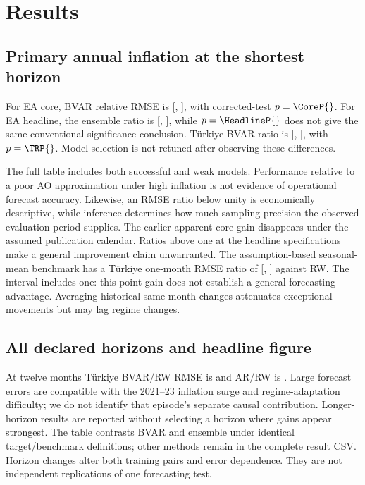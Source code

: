 \section{Results}
\subsection{Primary annual inflation at the shortest horizon}

For EA core, BVAR relative RMSE is \CoreRatio{} [\CoreLow{}, \CoreHigh{}], with corrected-test $p=\CoreP{}$. For EA headline, the ensemble ratio is \HeadlineRatio{} [\HeadlineLow{}, \HeadlineHigh{}], while $p=\HeadlineP{}$ does not give the same conventional significance conclusion. Türkiye BVAR ratio is \TRRatio{} [\TRLow{}, \TRHigh{}], with $p=\TRP{}$. Model selection is not retuned after observing these differences.

The full table includes both successful and weak models. Performance relative to a poor AO approximation under high inflation is not evidence of operational forecast accuracy. Likewise, an RMSE ratio below unity is economically descriptive, while inference determines how much sampling precision the observed evaluation period supplies. The earlier apparent core gain disappears under the assumed publication calendar. Ratios above one at the headline specifications make a general improvement claim unwarranted.
The assumption-based seasonal-mean benchmark has a Türkiye one-month RMSE ratio of \SeasonalTRRatio{} [\SeasonalTRLow{}, \SeasonalTRHigh{}] against RW. The interval includes one: this point gain does not establish a general forecasting advantage. Averaging historical same-month changes attenuates exceptional movements but may lag regime changes.
\subsection{All declared horizons and headline figure}

At twelve months Türkiye BVAR/RW RMSE is \TRLongBVAR{} and AR/RW is \TRLongAR{}. Large forecast errors are compatible with the 2021–23 inflation surge and regime-adaptation difficulty; we do not identify that episode's separate causal contribution. Longer-horizon results are reported without selecting a horizon where gains appear strongest. The table contrasts BVAR and ensemble under identical target/benchmark definitions; other methods remain in the complete result CSV. Horizon changes alter both training pairs and error dependence. They are not independent replications of one forecasting test.
